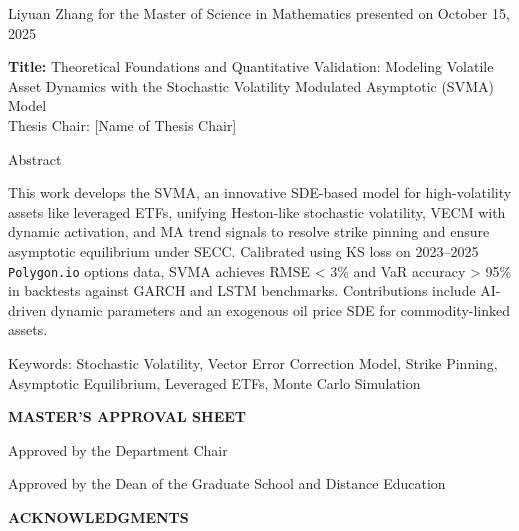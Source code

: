\documentclass[12pt]{report}
\begin{document}
\begin{flushleft}
    Liyuan Zhang for the Master of Science in Mathematics presented on October 15, 2025
   
    \vspace{0.2in}
    
    \textbf{Title:} Theoretical Foundations and Quantitative Validation: Modeling Volatile Asset Dynamics with the Stochastic Volatility Modulated Asymptotic (SVMA) Model \\
    \vspace{0.2in}
    Thesis Chair: [Name of Thesis Chair] \\
   
    \vspace{0.5in}
   
    \normalsize Abstract
   
    \vspace{0.2in}
     This work develops the SVMA, an innovative SDE-based model for high-volatility assets like leveraged ETFs, unifying Heston-like stochastic volatility, VECM with dynamic activation, and MA trend signals to resolve strike pinning and ensure asymptotic equilibrium under SECC. Calibrated using KS loss on 2023–2025 \texttt{Polygon.io} options data, SVMA achieves RMSE < 3\% and VaR accuracy > 95\% in backtests against GARCH and LSTM benchmarks. Contributions include AI-driven dynamic parameters and an exogenous oil price SDE for commodity-linked assets.
   
    \vspace{0.5in}
    
    Keywords: Stochastic Volatility, Vector Error Correction Model, Strike Pinning, Asymptotic Equilibrium, Leveraged ETFs, Monte Carlo Simulation
\end{flushleft}
\newpage
\thispagestyle{empty}
\begin{center}
    \textbf{MASTER'S APPROVAL SHEET}
\end{center}

\vspace{1in}

\normalsize Approved by the Department Chair

\vspace{1in}

\normalsize Approved by the Dean of the Graduate School and Distance Education
\newpage
\thispagestyle{plain}
\setcounter{page}{3}
\renewcommand{\thepage}{\roman{page}}
\begin{center}
    \textbf{ACKNOWLEDGMENTS}
\end{center}
\end{document}
